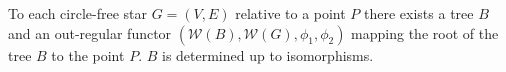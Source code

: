 \begin{lemma}
To each circle-free star $G = (V, E)$ relative to a point $P$ there exists a
tree $B$ and an out-regular functor $(\mathcal{W}(B), \mathcal{W}(G),
\phi_1, \phi_2)$ mapping the root of the tree $B$ to the point $P$. $B$ is
determined up to isomorphisms.
\end{lemma}



































